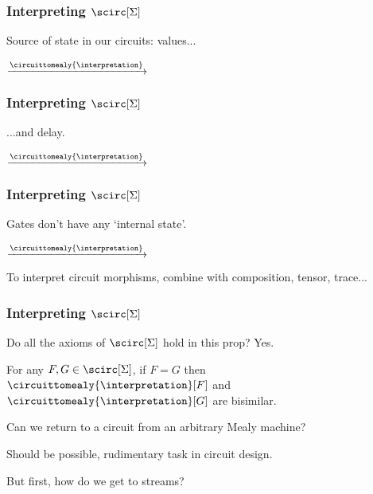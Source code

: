 \begin{frame}
    \frametitle{Interpreting \(\scirc[\Sigma]\)}    

    Source of \alert{state} in our circuits: \alert{values}...

    \pause

    \begin{center}
        \qquad
        \pause
        $\xrightarrow{\circuittomealy{\interpretation}}$
        \qquad
        \raisebox{-1.25em}{}
    \end{center}
\end{frame}

\begin{frame}
    \frametitle{Interpreting \(\scirc[\Sigma]\)}    
    ...and \alert{delay}.

    \pause
    \begin{center}
        \qquad
        \pause
        $\xrightarrow{\circuittomealy{\interpretation}}$
        \qquad
        \raisebox{-8em}{}
    \end{center}
\end{frame}


\begin{frame}
    \frametitle{Interpreting \(\scirc[\Sigma]\)}

    Gates don't have any `internal state'.

    \pause

    \begin{center}
        \qquad
        \pause
        $\xrightarrow{\circuittomealy{\interpretation}}$
        \qquad
        \raisebox{-1em}{}
    \end{center}

    \pause

    To interpret circuit morphisms, combine with composition, tensor, trace...

\end{frame}


\begin{frame}
    \frametitle{Interpreting \(\scirc[\Sigma]\)}

    Do all the axioms of \(\scirc[\Sigma]\) hold in this prop? \pause \alert{Yes.}

    \pause

    \begin{theorem}
        For any $F,G \in \scirc[\Sigma]$, if $F = G$ then $\circuittomealy{\interpretation}[F]$ and $\circuittomealy{\interpretation}[G]$ are bisimilar.
    \end{theorem}

    \pause

    Can we return to a circuit from an arbitrary Mealy machine? 

    \pause

    Should be possible, rudimentary task in circuit design.
 
    \pause

    But first, how do we get to \alert{streams}?

\end{frame}